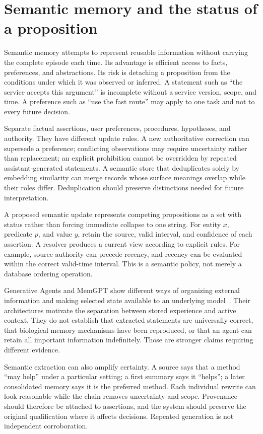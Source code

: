 \section{Semantic memory and the status of a proposition}\label{sec:C14:semantic}
Semantic memory attempts to represent reusable information without carrying the complete episode each time. Its advantage is efficient access to facts, preferences, and abstractions. Its risk is detaching a proposition from the conditions under which it was observed or inferred. A statement such as ``the service accepts this argument'' is incomplete without a service version, scope, and time. A preference such as ``use the fast route'' may apply to one task and not to every future decision.

Separate factual assertions, user preferences, procedures, hypotheses, and authority. They have different update rules. A new authoritative correction can supersede a preference; conflicting observations may require uncertainty rather than replacement; an explicit prohibition cannot be overridden by repeated assistant-generated statements. A semantic store that deduplicates solely by embedding similarity can merge records whose surface meanings overlap while their roles differ. Deduplication should preserve distinctions needed for future interpretation.

A proposed semantic update represents competing propositions as a set with status rather than forcing immediate collapse to one string. For entity $x$, predicate $p$, and value $y$, retain the source, valid interval, and confidence of each assertion. A resolver produces a current view according to explicit rules. For example, source authority can precede recency, and recency can be evaluated within the correct valid-time interval. This is a semantic policy, not merely a database ordering operation.

Generative Agents and MemGPT show different ways of organizing external information and making selected state available to an underlying model~\cite{park2023generativeagents,packer2023memgpt}. Their architectures motivate the separation between stored experience and active context. They do not establish that extracted statements are universally correct, that biological memory mechanisms have been reproduced, or that an agent can retain all important information indefinitely. Those are stronger claims requiring different evidence.

Semantic extraction can also amplify certainty. A source says that a method ``may help'' under a particular setting; a first summary says it ``helps''; a later consolidated memory says it is the preferred method. Each individual rewrite can look reasonable while the chain removes uncertainty and scope. Provenance should therefore be attached to assertions, and the system should preserve the original qualification where it affects decisions. Repeated generation is not independent corroboration.

